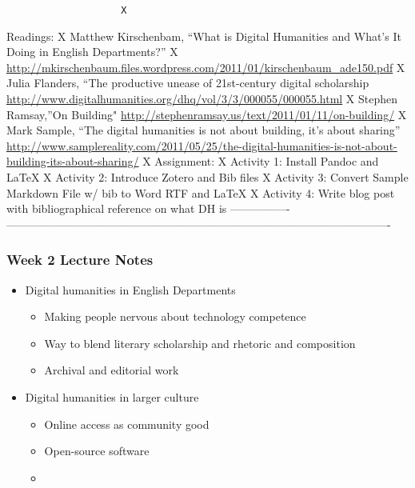\documentclass[]{article}
\begin{document}
\begin{verbatim}
                    X
\end{verbatim}

Readings: X Matthew Kirschenbam, ``What is Digital Humanities and What's
It Doing in English Departments?'' X
\url{http://mkirschenbaum.files.wordpress.com/2011/01/kirschenbaum_ade150.pdf}
X Julia Flanders, ``The productive unease of 21st-century digital
scholarship
\url{http://www.digitalhumanities.org/dhq/vol/3/3/000055/000055.html} X
Stephen Ramsay,''On Building"
\url{http://stephenramsay.us/text/2011/01/11/on-building/} X Mark
Sample, ``The digital humanities is not about building, it's about
sharing''
\url{http://www.samplereality.com/2011/05/25/the-digital-humanities-is-not-about-building-its-about-sharing/}
X Assignment: X Activity 1: Install Pandoc and LaTeX X Activity 2:
Introduce Zotero and Bib files X Activity 3: Convert Sample Markdown
File w/ bib to Word RTF and LaTeX X Activity 4: Write blog post with
bibliographical reference on what DH is ----------------
-------------------------------------------------------------------------------------------------------

\subsubsection{Week 2 Lecture Notes}\label{week-2-lecture-notes}

\begin{itemize}
\itemsep1pt\parskip0pt
\item
  Digital humanities in English Departments

  \begin{itemize}
  \itemsep1pt\parskip0pt
  \item
    Making people nervous about technology competence
  \item
    Way to blend literary scholarship and rhetoric and composition
  \item
    Archival and editorial work
  \end{itemize}
\item
  Digital humanities in larger culture

  \begin{itemize}
  \item
    Online access as community good
  \item
    Open-source software
  \item
  \end{itemize}
\end{itemize}
\end{document}
